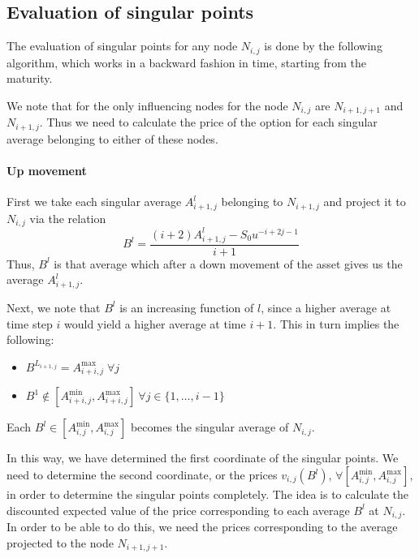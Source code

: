 \subsection{Evaluation of singular points}
\label{subsec:sp-asian-eu-eval}

The evaluation of singular points for any node $ N_{i,j} $ is done by the following algorithm, which works in a backward fashion in time, starting from the maturity.

We note that for the only influencing nodes for the node $ N_{i,j} $ are $ N_{i+1,j+1} $ and $ N_{i+1,j} $. Thus we need to calculate the price of the option for each singular average belonging to either of these nodes.


\paragraph{Up movement}

First we take each singular average $ A_{i+1,j}^l $ belonging to $ N_{i+1,j} $ and project it to $ N_{i,j} $ via the relation
\begin{equation}
	\label{eq:sp-asian-proj-up}
	B^l = \frac{ ( i+2) A_{i+1,j}^l - S_0 u^{-i+2j-1} }{ i+1 }
\end{equation}
Thus, $ B^l $ is that average which after a down movement of the asset gives us the average $ A_{i+1,j}^l $.

Next, we note that $ B^l $ is an increasing function of $ l $, since a higher average at time step $ i $ would yield a higher average at time $ i+1 $. This in turn implies the following:
\begin{itemize}
\item $ B^{L_{i+1,j}} = A_{i+i,j}^{\max} \; \forall j $
\item $ B^1 \notin \left[ A_{i+i,j}^{\min}, A_{i+i,j}^{\max} \right] \ \forall j \in \{1, \dots, i-1 \} $
\end{itemize}
Each $ B^l \in \left[ A_{i,j}^{\min}, A_{i,j}^{\max} \right] $ becomes the singular average of $ N_{i,j} $.

In this way, we have determined the first coordinate of the singular points. We need to determine the second coordinate, or the prices $ v_{i,j}(B^l) $, $ \forall \left[ A_{i,j}^{\min}, A_{i,j}^{\max} \right] $, in order to determine the singular points completely. The idea is to calculate the discounted expected value of the price corresponding to each average $ B^l $ at $ N_{i,j} $. In order to be able to do this, we need the prices corresponding to the average projected to the node $ N_{i+1,j+1} $.

